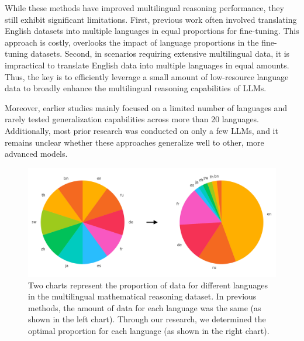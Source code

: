 \documentclass[11pt]{article}
\begin{document}
While these methods have improved multilingual reasoning performance, they still exhibit significant limitations. First, previous work often involved translating English datasets into multiple languages in equal proportions for fine-tuning. This approach is costly, overlooks the impact of language proportions in the fine-tuning datasets. Second, in scenarios requiring extensive multilingual data, it is impractical to translate English data into multiple languages in equal amounts. Thus, the key is to efficiently leverage a small amount of low-resource language data to broadly enhance the multilingual reasoning capabilities of LLMs.

Moreover, earlier studies mainly focused on a limited number of languages and rarely tested generalization capabilities across more than 20 languages. Additionally, most prior research was conducted on only a few LLMs, and it remains unclear whether these approaches generalize well to other, more advanced models.

\begin{figure}[h]
\begin{center}
\includegraphics[width=1\linewidth]{picture/figure1_pie.png}
\end{center}
\caption{Two charts represent the proportion
of data for different languages in the multilingual mathematical reasoning dataset. In previous methods, the amount of data for each language was the same (as shown in the left chart).
Through our research, we determined the optimal proportion for each language (as shown in the right chart).}
\end{figure}
\end{document}
